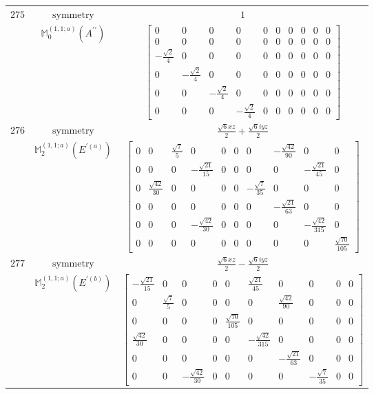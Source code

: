 \documentclass[fleqn,8pt,landscape]{jsarticle}
\begin{document}
\begin{longtable}{ccc}
$ 275 $ & $ \text{symmetry} $ & $ 1 $ \\
$  $ & $ \mathbb{M}_{0}^{(1,1;a)}(A^{\prime\prime}) $ & $ \begin{bmatrix} 0 & 0 & 0 & 0 & 0 & 0 & 0 & 0 & 0 & 0 \\ 0 & 0 & 0 & 0 & 0 & 0 & 0 & 0 & 0 & 0 \\ - \frac{\sqrt{2}}{4} & 0 & 0 & 0 & 0 & 0 & 0 & 0 & 0 & 0 \\ 0 & - \frac{\sqrt{2}}{4} & 0 & 0 & 0 & 0 & 0 & 0 & 0 & 0 \\ 0 & 0 & - \frac{\sqrt{2}}{4} & 0 & 0 & 0 & 0 & 0 & 0 & 0 \\ 0 & 0 & 0 & - \frac{\sqrt{2}}{4} & 0 & 0 & 0 & 0 & 0 & 0 \end{bmatrix} $ \\ \hline
$ 276 $ & $ \text{symmetry} $ & $ \frac{\sqrt{6} x z}{2} + \frac{\sqrt{6} i y z}{2} $ \\
$  $ & $ \mathbb{M}_{2}^{(1,1;a)}(E^{\prime(a)}) $ & $ \begin{bmatrix} 0 & 0 & \frac{\sqrt{7}}{5} & 0 & 0 & 0 & 0 & - \frac{\sqrt{42}}{90} & 0 & 0 \\ 0 & 0 & 0 & - \frac{\sqrt{21}}{15} & 0 & 0 & 0 & 0 & - \frac{\sqrt{21}}{45} & 0 \\ 0 & \frac{\sqrt{42}}{30} & 0 & 0 & 0 & 0 & - \frac{\sqrt{7}}{35} & 0 & 0 & 0 \\ 0 & 0 & 0 & 0 & 0 & 0 & 0 & - \frac{\sqrt{21}}{63} & 0 & 0 \\ 0 & 0 & 0 & - \frac{\sqrt{42}}{30} & 0 & 0 & 0 & 0 & - \frac{\sqrt{42}}{315} & 0 \\ 0 & 0 & 0 & 0 & 0 & 0 & 0 & 0 & 0 & \frac{\sqrt{70}}{105} \end{bmatrix} $ \\ \hline
$ 277 $ & $ \text{symmetry} $ & $ \frac{\sqrt{6} x z}{2} - \frac{\sqrt{6} i y z}{2} $ \\
$  $ & $ \mathbb{M}_{2}^{(1,1;a)}(E^{\prime(b)}) $ & $ \begin{bmatrix} - \frac{\sqrt{21}}{15} & 0 & 0 & 0 & 0 & \frac{\sqrt{21}}{45} & 0 & 0 & 0 & 0 \\ 0 & \frac{\sqrt{7}}{5} & 0 & 0 & 0 & 0 & \frac{\sqrt{42}}{90} & 0 & 0 & 0 \\ 0 & 0 & 0 & 0 & \frac{\sqrt{70}}{105} & 0 & 0 & 0 & 0 & 0 \\ \frac{\sqrt{42}}{30} & 0 & 0 & 0 & 0 & - \frac{\sqrt{42}}{315} & 0 & 0 & 0 & 0 \\ 0 & 0 & 0 & 0 & 0 & 0 & - \frac{\sqrt{21}}{63} & 0 & 0 & 0 \\ 0 & 0 & - \frac{\sqrt{42}}{30} & 0 & 0 & 0 & 0 & - \frac{\sqrt{7}}{35} & 0 & 0 \end{bmatrix} $ \\ \hline

\end{longtable}
\end{document}

